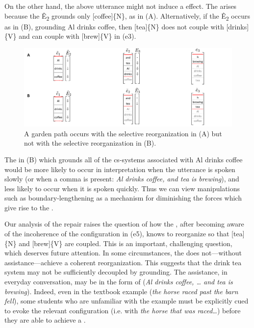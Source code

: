   On the other hand, the above utterance might not induce a  effect. The  arises because the  Ê\textsubscript{2} grounds only [coffee]\{N\}, as in {}(A). Alternatively, if the  Ê\textsubscript{2} occurs as in (B), grounding {\textbar}Al drinks coffee{\textbar}, then [tea]\{N\} does not couple with [drinks]\{V\} and can couple with [brew]\{V\} in (e3).

  
\begin{figure}
\includegraphics[width=\textwidth]{figures/Tilsen-img131.png}
\caption{A garden path occurs with the selective reorganization in (A) but not with the selective reorganization in (B).}
\label{fig:6:12}
\end{figure}
 

  The  in (B) which grounds all of the cs-systems associated with {\textbar}Al drinks coffee{\textbar} would be more likely to occur in interpretation when the utterance is spoken slowly (or when a comma is present: \textit{Al drinks coffee, and tea is brewing}), and less likely to occur when it is spoken quickly. Thus we can view  manipulations such as boundary-lengthening as a mechanism for diminishing the forces which give rise to the .

  Our analysis of the  repair raises the question of how the , after becoming aware of the incoherence of the configuration in (e5), knows to reorganize so that [tea]\{N\} and [brew]\{V\} are coupled. This is an important, challenging question, which deserves future attention. In some circumstances, the  does not—without assistance—achieve a coherent reorganization. This suggests that the {\textbar}drink tea{\textbar} system may not be sufficiently decoupled by grounding. The assistance, in everyday conversation, may be in the form of  (\textit{Al drinks coffee, … and tea is brewing}). Indeed, even in the textbook example (\textit{the horse raced past the barn fell}), some students who are unfamiliar with the example must be explicitly cued to evoke the relevant configuration (i.e. with \textit{the horse that was raced…}) before they are able to achieve a . 

